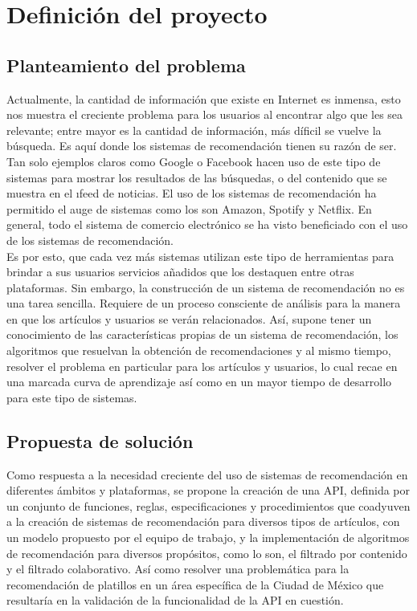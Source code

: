 \chapter {Definición del proyecto}
  \section{Planteamiento del problema}
    Actualmente, la cantidad de información que existe en Internet es inmensa, esto nos muestra el creciente problema para los usuarios al encontrar algo que les sea relevante; entre mayor es la cantidad de información, más díficil se vuelve la búsqueda. Es aquí donde los sistemas de recomendación tienen su razón de ser. Tan solo ejemplos claros como Google o Facebook hacen uso de este tipo de sistemas para mostrar los resultados de las búsquedas, o del contenido que se muestra en el \i{feed} de noticias. El uso de los sistemas de recomendación ha permitido el auge de sistemas como los son Amazon, Spotify y Netflix. En general, todo el sistema de comercio electrónico se ha visto beneficiado con el uso de los sistemas de recomendación.\\

    Es por esto, que cada vez más sistemas utilizan este tipo de herramientas para brindar a sus usuarios servicios añadidos que los destaquen entre otras plataformas. Sin embargo, la construcción de un sistema de recomendación no es una tarea sencilla. Requiere de un proceso consciente de análisis para la manera en que los artículos y usuarios se verán relacionados. Así, supone tener un conocimiento de las características propias de un sistema de recomendación, los algoritmos que resuelvan la obtención de recomendaciones y al mismo tiempo, resolver el problema en particular para los artículos y usuarios, lo cual recae en una marcada curva de aprendizaje así como en un mayor tiempo de desarrollo para este tipo de sistemas.\\

  \section{Propuesta de solución}
    Como respuesta a la necesidad creciente del uso de sistemas de recomendación en diferentes ámbitos y plataformas, se propone la creación de una API, definida por un conjunto de funciones, reglas, especificaciones y procedimientos que coadyuven a la creación de sistemas de recomendación para diversos tipos de artículos, con un modelo propuesto por el equipo de trabajo, y la implementación de algoritmos de recomendación para diversos propósitos, como lo son, el filtrado por contenido y el filtrado colaborativo. Así como resolver una problemática para la recomendación de platillos en un área específica de la Ciudad de México que resultaría en la validación de la funcionalidad de la API en cuestión. 

